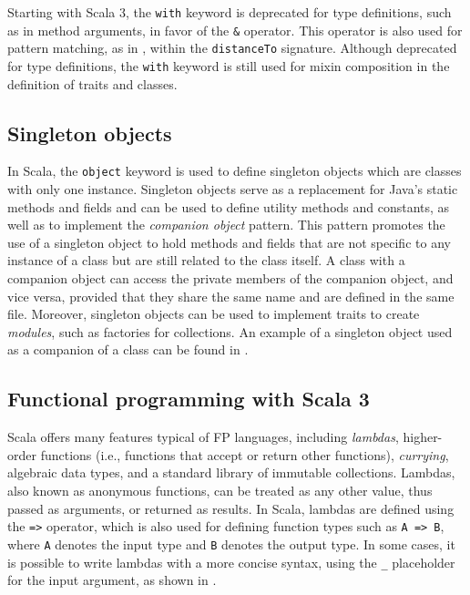 Starting with Scala 3, the \texttt{with} keyword is deprecated for type definitions, such as in method arguments, in favor of the \texttt{\&} operator.
%
This operator is also used for pattern matching, as in , within the \texttt{distanceTo} signature.
%
Although deprecated for type definitions, the \texttt{with} keyword is still used for mixin composition in the definition of traits and classes.


\subsection{Singleton objects} \label{chap:background->sec:scala3->subsec:singleton-objects}

In Scala, the \texttt{object} keyword is used to define singleton objects which are classes with only one instance.
%
Singleton objects serve as a replacement for Java's static methods and fields and can be used to define utility methods and constants, as well as to implement the \textit{companion object} pattern.
%
This pattern promotes the use of a singleton object to hold methods and fields that are not specific to any instance of a class but are still related to the class itself.
%
A class with a companion object can access the private members of the companion object, and vice versa, provided that they share the same name and are defined in the same file.
%
Moreover, singleton objects can be used to implement traits to create \textit{modules}, such as factories for collections.
%
An example of a singleton object used as a companion of a class can be found in .




\subsection{Functional programming with Scala 3} \label{chap:background->sec:scala3->subsec:functional-programming}

Scala offers many features typical of \ac{FP} languages, including \textit{lambdas}, higher-order functions (i.e., functions that accept or return other functions), \textit{currying}, algebraic data types, and a standard library of immutable collections.
%
Lambdas, also known as anonymous functions, can be treated as any other value, thus passed as arguments, or returned as results.
%
In Scala, lambdas are defined using the \texttt{=>} operator, which is also used for defining function types such as \texttt{A => B}, where \texttt{A} denotes the input type and \texttt{B} denotes the output type.
%
In some cases, it is possible to write lambdas with a more concise syntax, using the \texttt{\_} placeholder for the input argument, as shown in .


